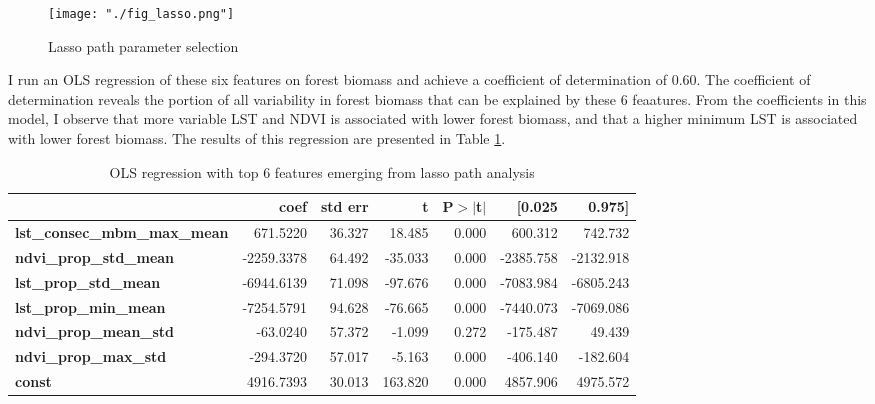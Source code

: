 \documentclass{article}
\begin{document}
\begin{figure}[!htbp]
  \centering
  \texttt{[image: "./fig\_lasso.png"]}
  \caption{\label{fig:lasso} Lasso path parameter selection}
\end{figure}

I run an OLS regression of these six features on forest biomass and achieve a coefficient of determination of 0.60. The coefficient of determination reveals the portion of all variability in forest biomass that can be explained by these 6 feaatures. From the coefficients in this model, I observe that more variable LST and NDVI is associated with lower forest biomass, and that a higher minimum LST is associated with lower forest biomass. The results of this regression are presented in Table \ref{tab:ols}.

\begin{table}[!htbp]
  \small
  \begin{center}
    \begin{tabular}{lrrrrrr}
    & \textbf{coef} & \textbf{std err} & \textbf{t} & \textbf{P$> |$t$|$} & \textbf{[0.025} & \textbf{0.975]}  \\
    \midrule
    \textbf{lst\_consec\_mbm\_max\_mean} &     671.5220  &       36.327     &    18.485  &         0.000        &      600.312    &      742.732     \\
    \textbf{ndvi\_prop\_std\_mean}       &   -2259.3378  &       64.492     &   -35.033  &         0.000        &    -2385.758    &    -2132.918     \\
    \textbf{lst\_prop\_std\_mean}        &   -6944.6139  &       71.098     &   -97.676  &         0.000        &    -7083.984    &    -6805.243     \\
    \textbf{lst\_prop\_min\_mean}        &   -7254.5791  &       94.628     &   -76.665  &         0.000        &    -7440.073    &    -7069.086     \\
    \textbf{ndvi\_prop\_mean\_std}       &     -63.0240  &       57.372     &    -1.099  &         0.272        &     -175.487    &       49.439     \\
    \textbf{ndvi\_prop\_max\_std}        &    -294.3720  &       57.017     &    -5.163  &         0.000        &     -406.140    &     -182.604     \\
    \textbf{const}                       &    4916.7393  &       30.013     &   163.820  &         0.000        &     4857.906    &     4975.572     \\
    \bottomrule
    \end{tabular}
    \end{center}
    \caption{\label{tab:ols} OLS regression with top 6 features emerging from lasso path analysis}
\end{table}
\end{document}
